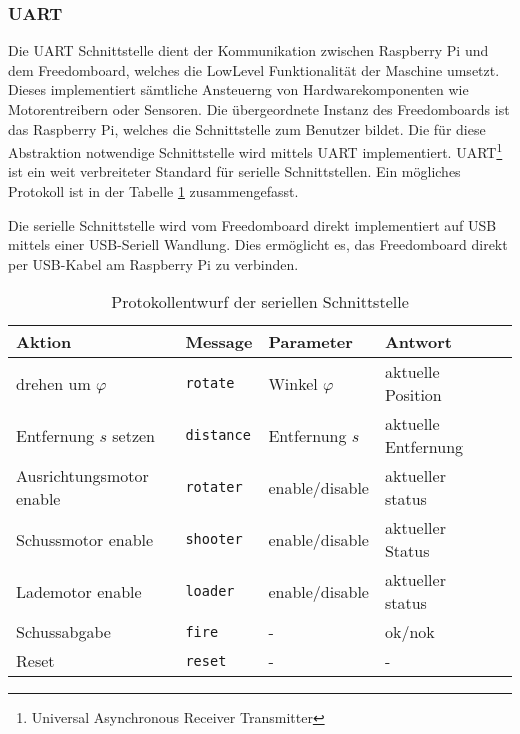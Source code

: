\subsubsection{UART}
\label{subsub:uart}
Die UART Schnittstelle dient der Kommunikation zwischen Raspberry Pi und
dem Freedomboard, welches die LowLevel Funktionalität der Maschine 
umsetzt. Dieses implementiert sämtliche Ansteuerng von Hardwarekomponenten
wie Motorentreibern oder Sensoren. Die übergeordnete Instanz des Freedomboards
ist das Raspberry Pi, welches die Schnittstelle zum Benutzer bildet. Die für
diese Abstraktion notwendige Schnittstelle wird mittels UART
implementiert. UART\footnote{Universal Asynchronous Receiver Transmitter} ist ein weit verbreiteter Standard für serielle Schnittstellen.  Ein mögliches Protokoll ist in der Tabelle \ref{tab:uart}
zusammengefasst.

Die serielle Schnittstelle wird vom Freedomboard direkt implementiert auf
USB mittels einer USB-Seriell Wandlung. Dies ermöglicht es, das Freedomboard
direkt per USB-Kabel am Raspberry Pi zu verbinden.

\begin{table}[h!]
	\centering
	\begin{tabular}{l l l l l}
		Aktion & Message & Parameter & Antwort \\
		\hline
		drehen um $\varphi$ 
			& \verb!rotate!
			& Winkel $\varphi$
			& aktuelle Position \\
		Entfernung $s$ setzen
			& \verb!distance!
			& Entfernung $s$
			& aktuelle Entfernung \\
		Ausrichtungsmotor enable
			& \verb!rotater!
			& enable/disable
			& aktueller status\\
		Schussmotor enable
			& \verb!shooter! 
			& enable/disable
			& aktueller Status \\
		Lademotor enable
			& \verb!loader!
			& enable/disable
			& aktueller status\\
		Schussabgabe
			& \verb!fire!
			& -
			& ok/nok\\
		Reset
			& \verb!reset!
			& -
			& -\\
	\end{tabular}
	\caption{Protokollentwurf der seriellen Schnittstelle}
	\label{tab:uart}
\end{table}
